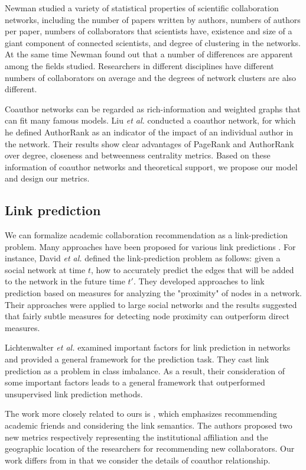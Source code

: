 \documentclass[10pt,journal,compsoc]{IEEEtran}
\begin{document}
Newman \cite{Newman:scientific} studied a variety of statistical properties of scientific collaboration networks, including the number of papers written by authors, numbers of authors per paper, numbers of collaborators that scientists have, existence and size of a giant component of connected scientists, and degree of clustering in the networks. At the same time Newman \cite{Newman:scientific} found out that  a number of differences are apparent among the fields studied. Researchers in different disciplines have different numbers of collaborators on average and the degrees of network clusters are also different.

Coauthor networks can be regarded as rich-information and weighted graphs that can fit many famous models. Liu \textit{et al.} \cite{liu2005co} conducted a coauthor network, for which he defined AuthorRank as an indicator of the impact of an individual author in the network. Their results show clear advantages of PageRank and AuthorRank over degree, closeness and betweenness centrality metrics.
Based on these information of coauthor networks and theoretical support, we propose our model and design our metrics.

\subsection{Link prediction}
We can formalize academic collaboration recommendation as a link-prediction problem. Many approaches have been proposed for various link predictions \cite{Liu:linkprediction}. For instance, David \textit{et al.} \cite{LN:linkprediction} defined the link-prediction problem as follows: given a social network at time $t$, how to accurately predict the edges that will be added to the network in the future time $t'$. They developed approaches to link prediction based on measures for analyzing the "proximity" of nodes in a network. Their approaches were applied to large social networks and the results suggested that fairly subtle measures for detecting node proximity can outperform direct measures.

Lichtenwalter \textit{et al.} \cite{Lichtenwalter:new} examined important factors for link prediction in networks and provided a general framework for the prediction task. They cast link prediction as a problem in class imbalance. As a result, their  consideration of some important factors leads to a general framework that outperformed unsupervised link prediction methods.

The work more closely related to ours is \cite{Brandao:using}, which emphasizes recommending academic friends and considering the link semantics. The authors proposed two new metrics respectively representing the institutional affiliation and the geographic location of the researchers for recommending new collaborators. Our work differs from \cite{Brandao:using} in that we consider the details of coauthor relationship.
\end{document}
